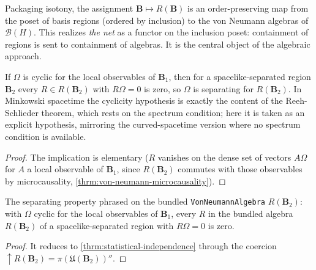 \begin{definition}
    \label{def:von-neumann-net}
    \leanok
    Packaging isotony, the assignment $\mathbf{B} \mapsto R(\mathbf{B})$ is an order-preserving map from the poset of basis regions (ordered by inclusion) to the von Neumann algebras of $\mathcal{B}(H)$. This realizes \emph{the net} as a functor on the inclusion poset: containment of regions is sent to containment of algebras. It is the central object of the algebraic approach.
\end{definition}

\begin{theorem}
    \label{thrm:statistical-independence}
    \leanok
    If $\Omega$ is cyclic for the local observables of $\mathbf{B}_1$, then for a spacelike-separated region $\mathbf{B}_2$ every $R \in R(\mathbf{B}_2)$ with $R\Omega = 0$ is zero, so $\Omega$ is separating for $R(\mathbf{B}_2)$. In Minkowski spacetime the cyclicity hypothesis is exactly the content of the Reeh-Schlieder theorem, which rests on the spectrum condition; here it is taken as an explicit hypothesis, mirroring the curved-spacetime version where no spectrum condition is available.
\end{theorem}
\begin{proof}
    \leanok
    The implication is elementary ($R$ vanishes on the dense set of vectors $A\Omega$ for $A$ a local observable of $\mathbf{B}_1$, since $R(\mathbf{B}_2)$ commutes with those observables by microcausality, \ref{thrm:von-neumann-microcausality}).
\end{proof}

\begin{theorem}
    \label{thrm:statistical-independence-bundled}
    \leanok
    The separating property phrased on the bundled \texttt{VonNeumannAlgebra} $R(\mathbf{B}_2)$: with $\Omega$ cyclic for the local observables of $\mathbf{B}_1$, every $R$ in the bundled algebra $R(\mathbf{B}_2)$ of a spacelike-separated region with $R\Omega = 0$ is zero.
\end{theorem}
\begin{proof}
    \leanok
    It reduces to \ref{thrm:statistical-independence} through the coercion $\uparrow R(\mathbf{B}_2) = \pi(\mathfrak{U}(\mathbf{B}_2))''$.
\end{proof}

